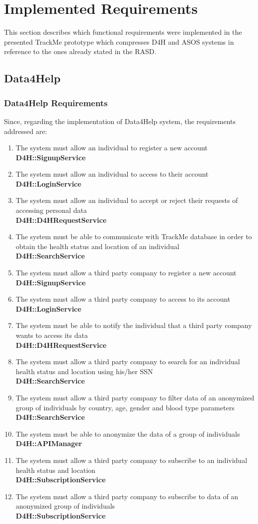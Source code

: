 \documentclass[a4paper, hidelinks, 12pt]{report}
\newcommand\requirement[1]{\item[{[R#1]}] }
\begin{document}
	\chapter{Implemented Requirements}
This section describes which functional requirements were implemented in the presented TrackMe prototype which compresses D4H and ASOS systems in reference to the ones already stated in the RASD.

\section{\textbf{Data4Help}}
\subsection{Data4Help Requirements}
	Since, regarding the implementation of Data4Help system, the requirements addressed are:

	\begin{enumerate}
		\requirement{1} The system must allow an individual to register a new account \\
		\textbf{D4H::SignupService}
		\requirement{2} The system must allow an individual to access to their account \\
		\textbf{D4H::LoginService}
		\requirement{3} The system must allow an individual to accept or reject their requests of accessing personal data \\
		\textbf{D4H::D4HRequestService}
		\requirement{4} The system must be able to communicate with TrackMe database in order to obtain the health status and location of an individual \\
		\textbf{D4H::SearchService}
		\requirement{5} The system must allow a third party company to register a new account \\
		\textbf{D4H::SignupService}
		\requirement{6} The system must allow a third party company to access to its account 	\\
		\textbf{D4H::LoginService}
		\requirement{7} The system must be able to notify the individual that a third party company wants to access its data \\
		\textbf{D4H::D4HRequestService}
		\requirement{8} The system must allow a third party company to search for an individual health status and location using his/her SSN \\
		 \textbf{D4H::SearchService}
		 \requirement{9} The system must allow a third party company to filter data of an anonymized group of individuals by country, age, gender and blood type parameters \\
		 \textbf{D4H::SearchService}
		 \requirement{10} The system must be able to anonymize the data of a group of individuals \\
		 \textbf{D4H::APIManager}
		 \requirement{11} The system must allow a third party company to subscribe to an individual health status and location \\
		\textbf{D4H::SubscriptionService}
		\requirement{12} The system must allow a third party company to subscribe to data of an anonymized group of individuals \\
		\textbf{D4H::SubscriptionService}
	\end{enumerate}
\end{document}
